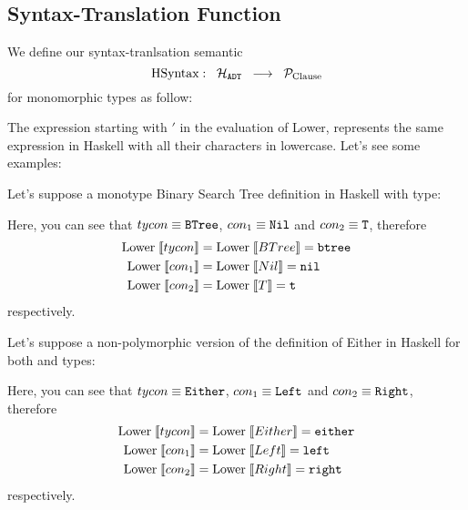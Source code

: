 \subsection{Syntax-Translation Function}\label{subsec:monomorphic-types-function}
We define our syntax-tranlsation semantic $$\text{HSyntax} :\;\; \mathcal{H}_{\texttt{ADT}} \;\; \longrightarrow \;\; \mathcal{P}_{\text{Clause}}$$ for monomorphic types as follow:
\small


\normalsize
The expression starting with $'$ in the evaluation of Lower, represents the same expression in Haskell with all their characters in lowercase. Let's see some examples:\\
    \begin{example}
    Let's suppose a monotype Binary Search Tree definition in Haskell with  type:
    
    Here, you can see that $tycon \equiv \texttt{BTree}$, $con_1 \equiv \texttt{Nil}$ and $con_2 \equiv \texttt{T}$, therefore 
    \begin{align*}
        \text{Lower} \; \llbracket tycon \rrbracket =& \; \text{Lower} \; \llbracket BTree \rrbracket = \texttt{btree}\\
        \text{Lower} \; \llbracket con_1 \rrbracket =& \; \text{Lower} \; \llbracket Nil \rrbracket = \texttt{nil} \\
        \text{Lower} \; \llbracket con_2 \rrbracket =& \; \text{Lower} \; \llbracket T \rrbracket = \texttt{t}
    \end{align*}
    respectively.\\
    \end{example}
    \begin{example}
    Let's suppose a non-polymorphic version of the definition of Either in Haskell for both  and  types:
    
    Here, you can see that $tycon \equiv \texttt{Either}$, $con_1 \equiv \texttt{Left}$ and $con_2 \equiv \texttt{Right}$, therefore
        \begin{align*}
        \text{Lower} \; \llbracket tycon \rrbracket =& \; \text{Lower} \; \llbracket Either \rrbracket = \texttt{either}\\
        \text{Lower} \; \llbracket con_1 \rrbracket =& \; \text{Lower} \; \llbracket Left \rrbracket = \texttt{left} \\
        \text{Lower} \; \llbracket con_2 \rrbracket =& \; \text{Lower} \; \llbracket Right \rrbracket = \texttt{right}
    \end{align*}
        respectively.
    \end{example}
\small
